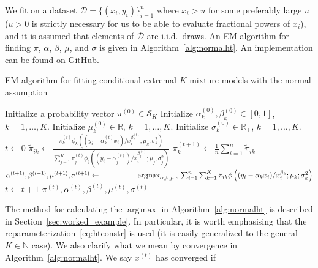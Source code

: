 \documentclass[11pt,twoside,openany]{book}
\newcommand{\reals}{\mathbb{R}}
\newcommand{\D}{\mathcal{D}}
\DeclareMathOperator*{\argmax}{arg\!max}
\numberwithin{Theorem}{chapter}
\numberwithin{Definition}{chapter}
\numberwithin{Lemma}{chapter}
\numberwithin{Algorithm}{chapter}
\numberwithin{equation}{chapter}
\begin{document}
We fit on a dataset
$\mathcal{D}=\{(x_i,y_i)\}_{i=1}^n$ where $x_i > u$ for some preferably large
$u$ ($u>0$ is strictly necessary for us to be able to evaluate fractional
powers of $x_i$), and it is assumed that elements of $\D$ are i.i.d.\ draws.
An EM
algorithm for finding $\pi$, $\alpha$, $\beta$, $\mu$, and $\sigma$ is
given in Algorithm~\ref{alg:normalht}.
An implementation can be found on \href{https://github.com/lippirk/edi-diss/blob/main/ht-em/normal.jl}{GitHub}.


\begin{algorithm}
\caption{EM algorithm for fitting conditional extremal $K$-mixture models with the normal assumption\label{alg:normalht}}
\begin{algorithmic}
\State Initialize a probability vector $\pi^{(0)}\in\mathcal{S}_K$
\State Initialize $\alpha_k^{(0)},\beta_k^{(0)}\in[0,1]$, $k=1,\ldots,K$.
\State Initialize $\mu_k^{(0)}\in\reals$, $k=1,\ldots,K$.
\State Initialize $\sigma_k^{(0)}\in\reals_{+}$, $k=1,\ldots,K$.
\State $t \gets 0$
 
    \State $\tilde\pi_{ik}  \gets \frac{\pi^{(t)}_k \phi_k\left((y_i -  \alpha_k^{(t)}x_i)/x_i^{\beta_k^{(t)}};\mu_k,\sigma^2_k\right)}{\sum_{j=1}^K\pi^{(t)}_j
    \phi_j\left((y_i -  \alpha_j^{(t)})/x_i^{\beta_j^{(t)}};\mu_j,\sigma_j^2\right)}$
    \EndFor
  \EndFor
   
  \State $\pi_k^{(t+1)} \gets \frac{1}{n}\sum_{i=1}^n \tilde\pi_{ik}$
  \EndFor
  \State $\alpha^{(t+1)},\beta^{(t+1)},\mu^{(t+1)},\sigma^{(t+1)}
  \gets\newline\hspace*{5em}\argmax_{\alpha,\beta,\mu,\sigma} \sum_{i=1}^n\sum_{k=1}^K\tilde\pi_{ik}\phi\left((y_i - \alpha_k x_i)/x_i^{\beta_k};\mu_k;\sigma_k^2 \right)$ 
  \State $t \gets t + 1$
\EndWhile
\State \Return $\pi^{(t)},\alpha^{(t)},\beta^{(t)},\mu^{(t)},\sigma^{(t)}$
\end{algorithmic}
\end{algorithm}


The method for calculating the $\argmax$ in Algorithm~\ref{alg:normalht} is
described in Section~\ref{sec:worked_example}. In particular, it is worth
emphasising that the reparameterization~\ref{eq:htconstr} is used (it is easily
generalized to the general $K\in\mathbb{N}$ case). We also clarify what we mean
by convergence in Algorithm~\ref{alg:normalht}. We say $x^{(t)}$ has converged
if
\end{document}
